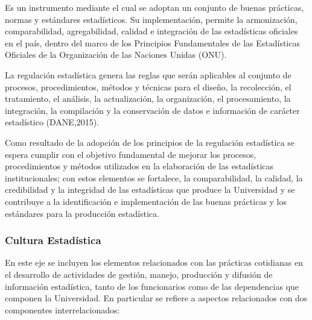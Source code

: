 \documentclass[
]{book}
\begin{document}
Es un instrumento mediante el cual se adoptan un conjunto de buenas prácticas, normas y estándares estadísticos. Su implementación, permite la armonización, comparabilidad, agregabilidad, calidad e integración de las estadísticas oficiales en el país, dentro del marco de los Principios Fundamentales de las Estadísticas Oficiales de la Organización de las Naciones Unidas (ONU).

La regulación estadística genera las reglas que serán aplicables al conjunto de procesos, procedimientos, métodos y técnicas para el diseño, la recolección, el tratamiento, el análisis, la actualización, la organización, el procesamiento, la integración, la compilación y la conservación de datos e información de carácter estadístico (DANE,2015).

Como resultado de la adopción de los principios de la regulación estadística se espera cumplir con el objetivo fundamental de mejorar los procesos, procedimientos y métodos utilizados en la elaboración de las estadísticas institucionales; con estos elementos se fortalece, la comparabilidad, la calidad, la credibilidad y la integridad de las estadísticas que produce la Universidad y se contribuye a la identificación e implementación de las buenas prácticas y los estándares para la producción estadística.

\hypertarget{cultura-estaduxedstica}{%
\subsubsection{Cultura Estadística}\label{cultura-estaduxedstica}}

En este eje se incluyen los elementos relacionados con las prácticas cotidianas en el desarrollo de actividades de gestión, manejo, producción y difusión de información estadística, tanto de los funcionarios como de las dependencias que componen la Universidad. En particular se refiere a aspectos relacionados con dos componentes interrelacionados:
\end{document}
